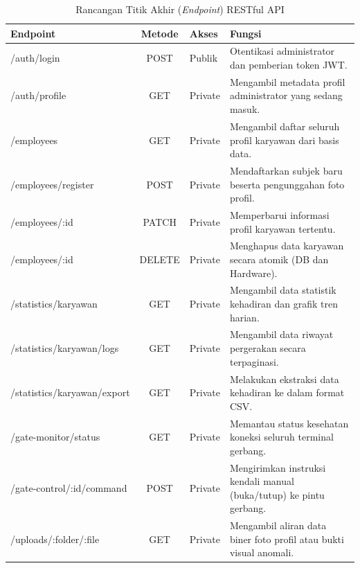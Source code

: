 \begin{table}[t]
    \centering
    \caption{Rancangan Titik Akhir (\textit{Endpoint}) RESTful API}
    \label{tab:api_restful}
    \begin{tabular}{|l|c|l|p{6cm}|}
        \hline
        \textbf{Endpoint} & \textbf{Metode} & \textbf{Akses} & \textbf{Fungsi} \\
        \hline
        /auth/login & POST & Publik & Otentikasi administrator dan pemberian token JWT. \\
        \hline
        /auth/profile & GET & Private & Mengambil metadata profil administrator yang sedang masuk. \\
        \hline
        /employees & GET & Private & Mengambil daftar seluruh profil karyawan dari basis data. \\
        \hline
        /employees/register & POST & Private & Mendaftarkan subjek baru beserta pengunggahan foto profil. \\
        \hline
        /employees/:id & PATCH & Private & Memperbarui informasi profil karyawan tertentu. \\
        \hline
        /employees/:id & DELETE & Private & Menghapus data karyawan secara atomik (DB dan Hardware). \\
        \hline
        /statistics/karyawan & GET & Private & Mengambil data statistik kehadiran dan grafik tren harian. \\
        \hline
        /statistics/karyawan/logs & GET & Private & Mengambil data riwayat pergerakan secara terpaginasi. \\
        \hline
        /statistics/karyawan/export & GET & Private & Melakukan ekstraksi data kehadiran ke dalam format CSV. \\
        \hline
        /gate-monitor/status & GET & Private & Memantau status kesehatan koneksi seluruh terminal gerbang. \\
        \hline
        /gate-control/:id/command & POST & Private & Mengirimkan instruksi kendali manual (buka/tutup) ke pintu gerbang. \\
        \hline
        /uploads/:folder/:file & GET & Private & Mengambil aliran data biner foto profil atau bukti visual anomali. \\
        \hline
    \end{tabular}
\end{table}
